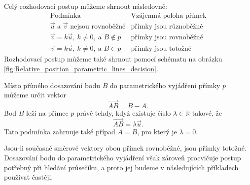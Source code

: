 Celý rozhodovací postup můžeme shrnout následovně:
\[
\begin{array}{c|c}
\text{Podmínka}
&
\text{Vzájemná poloha přímek}
\\
\hline
\vec{u}\text{ a }\vec{v}\text{ nejsou rovnoběžné}
&
\text{přímky jsou různoběžné}
\\[1mm]
\vec{v}=k\vec{u},\ k\neq0,\ \text{a }B\notin p
&
\text{přímky jsou rovnoběžné}
\\[1mm]
\vec{v}=k\vec{u},\ k\neq0,\ \text{a }B\in p
&
\text{přímky jsou totožné}
\end{array}
\]
Rozhodovací postup můžeme také shrnout pomocí schématu na obrázku
\ref{fig:Relative_position_parametric_lines_decision}.

\begin{remark}\label{rem:Alternative_test_coincident_lines}
    Místo přímého dosazování bodu $B$ do parametrického vyjádření
    přímky $p$ můžeme určit vektor
    \[
        \overrightarrow{AB}=B-A.
    \]
    Bod $B$ leží na přímce $p$ právě tehdy, když existuje číslo
    $\lambda\in\mathbb{R}$ takové, že
    \[
        \overrightarrow{AB}=\lambda\vec{u}.
    \]
    Tato podmínka zahrnuje také případ $A=B$, pro který je
    $\lambda=0$.

    Jsou-li současně směrové vektory obou přímek rovnoběžné, jsou
    přímky totožné. Dosazování bodu do parametrického vyjádření však
    zároveň procvičuje postup potřebný při hledání průsečíku, a proto
    jej budeme v následujících příkladech používat častěji.
\end{remark}

